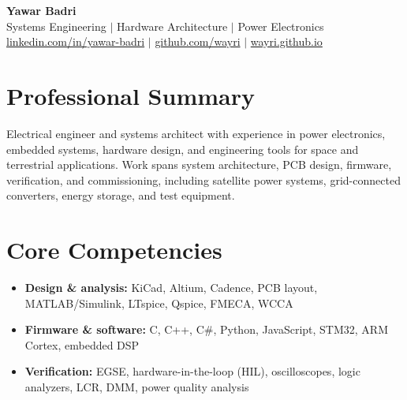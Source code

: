 \documentclass[11pt, a4paper]{article}
\begin{document}
\pagestyle{plain}
\renewcommand{\thepage}{\arabic{page}/2}

\begin{center}
    {\LARGE \textbf{\color{primary}Yawar Badri}} \\
    \vspace{0.25em}
    {\normalsize \color{muted} Systems Engineering $|$ Hardware Architecture $|$ Power Electronics} \\
    \vspace{0.25em}
    \href{https://linkedin.com/in/yawar-badri}{linkedin.com/in/yawar-badri} $|$ 
    \href{https://github.com/wayri}{github.com/wayri} $|$ 
    \href{https://wayri.github.io}{wayri.github.io}
\end{center}

\vspace{0.2em}

\section*{Professional Summary}
\small{Electrical engineer and systems architect with experience in power electronics, embedded systems, hardware design, and engineering tools for space and terrestrial applications. Work spans system architecture, PCB design, firmware, verification, and commissioning, including satellite power systems, grid-connected converters, energy storage, and test equipment.}

\section*{Core Competencies}
\begin{itemize}[leftmargin=1.5em, rightmargin=0em, parsep=0pt, itemsep=2pt, topsep=0pt]
    \item \textbf{Design \& analysis:} KiCad, Altium, Cadence, PCB layout, MATLAB/Simulink, LTspice, Qspice, FMECA, WCCA
    \item \textbf{Firmware \& software:} C, C++, C\#, Python, JavaScript, STM32, ARM Cortex, embedded DSP
    \item \textbf{Verification:} EGSE, hardware-in-the-loop (HIL), oscilloscopes, logic analyzers, LCR, DMM, power quality analysis
\end{itemize}

\end{document}
